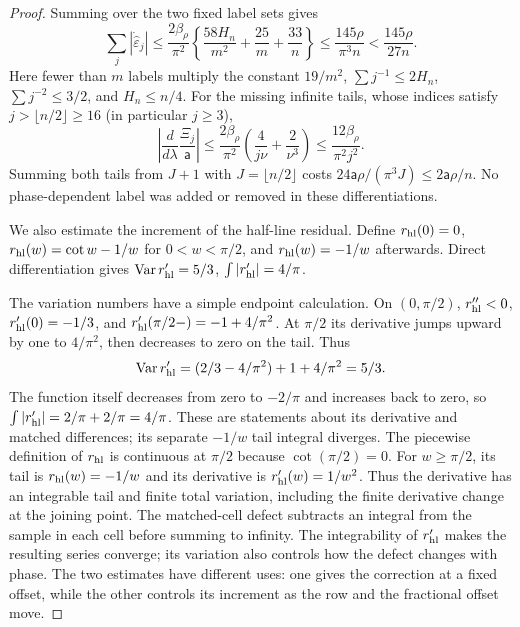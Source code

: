 \begin{proof}
Summing over the two fixed label sets gives
\[
 \sum_j|\dot{\widehat\varepsilon}_j|
 \leq\frac{2\beta_\rho}{\pi^2}
       \left\{\frac{58H_n}{m^2}+\frac{25}m+\frac{33}n\right\}
 \leq\frac{145\rho}{\pi^3n}<\frac{145\rho}{27n}.
\]
Here fewer than $m$ labels multiply the constant $19/m^2$,
$\sum j^{-1}\leq2H_n$, $\sum j^{-2}\leq3/2$, and
$H_n\leq n/4$. For the missing infinite tails, whose indices satisfy $j>\lfloor n/2\rfloor\geq16$ (in particular $j\geq3$),
\[
 \left|\frac d{d\lambda}\frac{\Xi_j}{\mathsf{a}}\right|
 \leq\frac{2\beta_\rho}{\pi^2}
             \left(\frac4{j\nu}+\frac2{\nu^3}\right)
 \leq\frac{12\beta_\rho}{\pi^2j^2}.
\]
Summing both tails from $J+1$ with $J=\lfloor n/2\rfloor$ costs
$24\mathsf{a}\rho/(\pi^3J)\leq2\mathsf{a}\rho/n$. No phase-dependent label was
added or removed in these differentiations.

We also estimate the increment of the half-line residual. Define $r_{\rm hl}(0)=0$,
$r_{\rm hl}(w)=\cot w-1/w$ for $0<w<\pi/2$, and $r_{\rm hl}(w)=-1/w$ afterwards.
Direct differentiation gives
$\operatorname{Var}r_{\rm hl}'=5/3$, $\int|r_{\rm hl}'|=4/\pi$.

The variation numbers have a simple endpoint calculation.
On $(0,\pi/2)$, $r_{\rm hl}''<0$, $r_{\rm hl}'(0)=-1/3$, and
$r_{\rm hl}'(\pi/2-)=-1+4/\pi^2$. At $\pi/2$ its derivative jumps upward
by one to $4/\pi^2$, then decreases to zero on the tail. Thus
\[
 \operatorname{Var}r_{\rm hl}'=(2/3-4/\pi^2)+1+4/\pi^2=5/3.
\]
The function itself decreases from zero to $-2/\pi$ and increases
back to zero, so $\int|r_{\rm hl}'|=2/\pi+2/\pi=4/\pi$. These are
statements about its derivative and matched differences; its separate
$-1/w$ tail integral diverges.
The piecewise definition of $r_{\rm hl}$ is continuous at $\pi/2$ because
$\cot(\pi/2)=0$. For $w\geq\pi/2$, its tail is $r_{\rm hl}(w)=-1/w$
and its derivative is $r_{\rm hl}'(w)=1/w^2$. Thus the derivative has an
integrable tail and finite total variation, including the finite
derivative change at the joining point. The matched-cell defect
subtracts an integral from the sample in each cell before summing to
infinity. The integrability of $r_{\rm hl}'$ makes the resulting series converge;
its variation also controls how the defect changes with phase.
The two estimates have different uses: one gives the correction at a
fixed offset, while the other controls its increment as the row and
the fractional offset move.


\end{proof}

